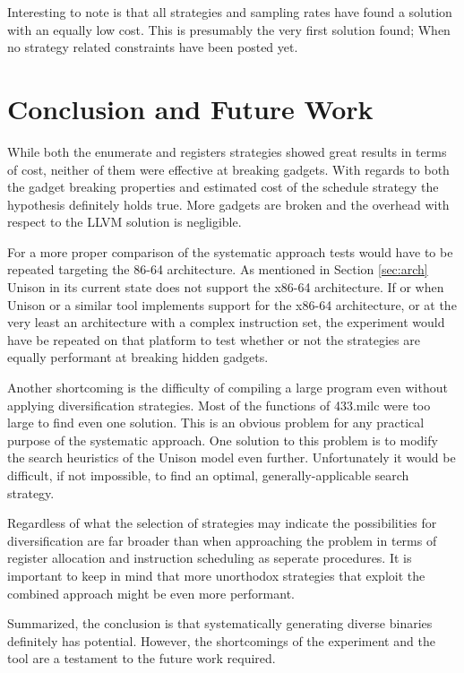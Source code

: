 Interesting to note is that all strategies and sampling rates have found a solution with
an equally low cost. This is presumably the very first solution found; When no strategy
related constraints have been posted yet.

\section{Conclusion and Future Work}

While both the enumerate and registers strategies showed great results in terms of cost,
neither of them were effective at breaking gadgets. With regards to both the gadget
breaking properties and estimated cost of the schedule strategy the hypothesis definitely
holds true. More gadgets are broken and the overhead with respect to the LLVM solution
is negligible.

For a more proper comparison of the systematic approach tests would have to be repeated
targeting the 86-64 architecture. As mentioned in Section \ref{sec:arch} Unison in its
current state does not support the x86-64 architecture. If or when Unison or a similar
tool implements support for the x86-64 architecture, or at the very least an architecture
with a complex instruction set, the experiment would have be repeated on that platform to
test whether or not the strategies are equally performant at breaking hidden gadgets.

Another shortcoming is the difficulty of compiling a large program even without applying
diversification strategies. Most of the functions of 433.milc were too large to find even
one solution. This is an obvious problem for any practical purpose of the systematic
approach. One solution to this problem is to modify the search heuristics of the Unison
model even further. Unfortunately it would be difficult, if not impossible, to find an
optimal, generally-applicable search strategy.

Regardless of what the selection of strategies may indicate the possibilities for
diversification are far broader than when approaching the problem in terms of register
allocation and instruction scheduling as seperate procedures. It is important to keep in
mind that more unorthodox strategies that exploit the combined approach might be even
more performant.

Summarized, the conclusion is that systematically generating diverse binaries definitely
has potential. However, the shortcomings of the experiment and the tool are a testament to
the future work required.
